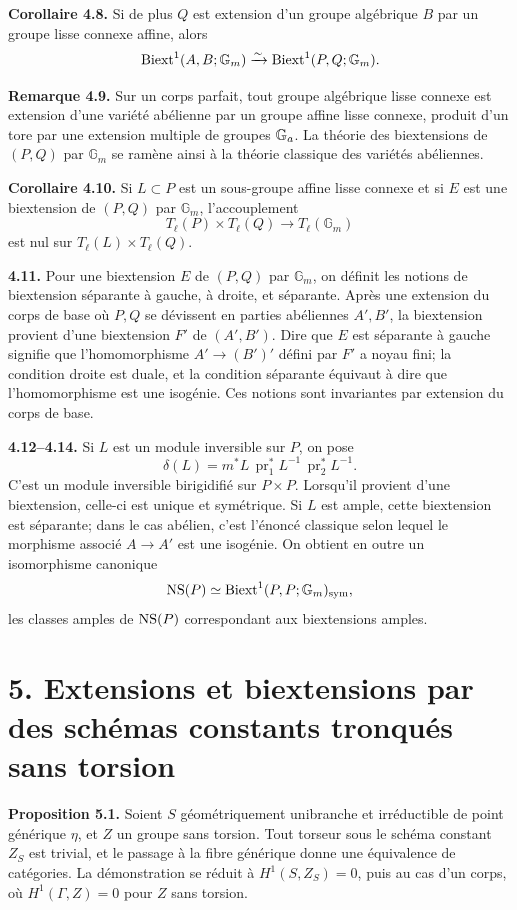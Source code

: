 \documentclass[11pt]{article}
\providecommand{\Gm}{\mathbb G_m}
\providecommand{\pr}{\operatorname{pr}}
\begin{document}
\textbf{Corollaire 4.8.}  Si de plus \(Q\) est extension d'un groupe algébrique \(B\) par un groupe lisse connexe affine, alors
\[
  \Biext^1(A,B;\Gm)\xrightarrow{\sim}\Biext^1(P,Q;\Gm).
\]

\textbf{Remarque 4.9.}  Sur un corps parfait, tout groupe algébrique lisse connexe est extension d'une variété abélienne par un groupe affine lisse connexe, produit d'un tore par une extension multiple de groupes \(\mathbb G_a\).  La théorie des biextensions de \((P,Q)\) par \(\Gm\) se ramène ainsi à la théorie classique des variétés abéliennes.

\textbf{Corollaire 4.10.}  Si \(L\subset P\) est un sous-groupe affine lisse connexe et si \(E\) est une biextension de \((P,Q)\) par \(\Gm\), l'accouplement
\[
  T_\ell(P)\times T_\ell(Q)\longrightarrow T_\ell(\Gm)
\]
est nul sur \(T_\ell(L)\times T_\ell(Q)\).

\textbf{4.11.}  Pour une biextension \(E\) de \((P,Q)\) par \(\Gm\), on définit les notions de biextension séparante à gauche, à droite, et séparante.  Après une extension du corps de base où \(P,Q\) se dévissent en parties abéliennes \(A',B'\), la biextension provient d'une biextension \(F'\) de \((A',B')\).  Dire que \(E\) est séparante à gauche signifie que l'homomorphisme \(A'\to(B')'\) défini par \(F'\) a noyau fini; la condition droite est duale, et la condition séparante équivaut à dire que l'homomorphisme est une isogénie.  Ces notions sont invariantes par extension du corps de base.

\textbf{4.12--4.14.}  Si \(L\) est un module inversible sur \(P\), on pose
\[
  \delta(L)=m^*L\,\pr_1^*L^{-1}\,\pr_2^*L^{-1}.
\]
C'est un module inversible birigidifié sur \(P\times P\).  Lorsqu'il provient d'une biextension, celle-ci est unique et symétrique.  Si \(L\) est ample, cette biextension est séparante; dans le cas abélien, c'est l'énoncé classique selon lequel le morphisme associé \(A\to A'\) est une isogénie.  On obtient en outre un isomorphisme canonique
\[
  \NS(P)\simeq \Biext^1(P,P;\Gm)_{\mathrm{sym}},
\]
les classes amples de \(\operatorname{NS}(P)\) correspondant aux biextensions amples.

\section*{5. Extensions et biextensions par des schémas constants tronqués sans torsion}

\textbf{Proposition 5.1.}  Soient \(S\) géométriquement unibranche et irréductible de point générique \(\eta\), et \(Z\) un groupe sans torsion.  Tout torseur sous le schéma constant \(Z_S\) est trivial, et le passage à la fibre générique donne une équivalence de catégories.  La démonstration se réduit à \(H^1(S,Z_S)=0\), puis au cas d'un corps, où \(H^1(\Gamma,Z)=0\) pour \(Z\) sans torsion.
\end{document}
